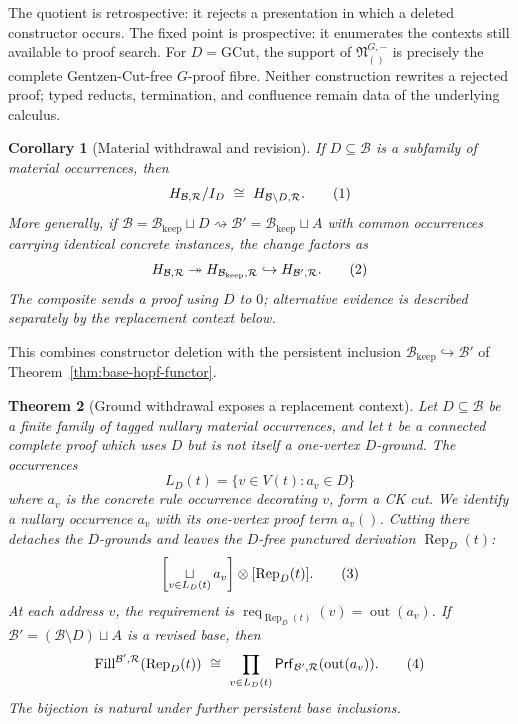\documentclass[10pt,a4paper]{article}
\theoremstyle{plain}
\newtheorem{theorem}{Theorem}[section]
\newtheorem{corollary}[theorem]{Corollary}
\theoremstyle{definition}
\theoremstyle{remark}
\newcommand{\Base}{\mathcal B}
\newcommand{\Rules}{\mathcal R}
\newcommand{\fjoin}{\mathbin{\sqcup}}
\newcommand{\Fill}{\operatorname{Fill}}
\newcommand{\Req}{\operatorname{req}}
\newcommand{\Prf}{\mathsf{Prf}}
\newcommand{\eqtag}{\refstepcounter{equation}\tag{\theequation}}
\begin{document}
The quotient is retrospective: it rejects a presentation in which a
deleted constructor occurs.  The fixed point is prospective: it enumerates
the contexts still available to proof search.  For
\(D=\mathrm{GCut}\), the support of
\(\mathfrak N_{()}^{G,-}\) is precisely the complete
Gentzen-Cut-free \(G\)-proof fibre.  Neither construction rewrites a
rejected proof; typed reducts, termination, and confluence remain data of
the underlying calculus.

\begin{corollary}[Material withdrawal and revision]
\label{thm:material-withdrawal}
If \(D\subseteq\Base\) is a subfamily of material occurrences, then
\[
 H_{\Base,\Rules}/I_D
   \ \cong\
 H_{\Base\setminus D,\Rules}.
\eqtag\label{eq:withdrawal-hopf-quotient}
\]
More generally, if
\(
 \Base=\Base_{\mathrm{keep}}\sqcup D
 \rightsquigarrow
 \Base'=\Base_{\mathrm{keep}}\sqcup A
\)
with common occurrences carrying identical concrete instances, the change factors as
\[
 H_{\Base,\Rules}
   \twoheadrightarrow
 H_{\Base_{\mathrm{keep}},\Rules}
   \hookrightarrow
 H_{\Base',\Rules}.
\eqtag\label{eq:revision-quotient-inclusion}
\]
The composite sends a proof using \(D\) to \(0\); alternative evidence is
described separately by the replacement context below.
\end{corollary}

This combines constructor deletion with the persistent inclusion
\(\Base_{\mathrm{keep}}\hookrightarrow\Base'\) of
Theorem~\ref{thm:base-hopf-functor}.

\begin{theorem}[Ground withdrawal exposes a replacement context]
\label{thm:ground-repair-fibre}
Let \(D\subseteq\Base\) be a finite family of tagged nullary material
occurrences,
and let \(t\) be a connected complete proof which uses \(D\) but is not
itself a one-vertex \(D\)-ground.  The occurrences
\[
 L_D(t)=\{v\in V(t):a_v\in D\}
\]
where \(a_v\) is the concrete rule occurrence decorating \(v\), form a CK
cut.  We identify a nullary occurrence \(a_v\) with its one-vertex
proof term \(a_v()\).
Cutting there detaches the \(D\)-grounds and
leaves the \(D\)-free punctured derivation \(\operatorname{Rep}_D(t)\):
\[
 \left[\mathop{\fjoin}_{v\in L_D(t)}a_v\right]\otimes
       [\operatorname{Rep}_D(t)] .
\eqtag\label{eq:ground-repair-coefficient}
\]
At each address \(v\), the requirement is
\(\Req_{\operatorname{Rep}_D(t)}(v)=\operatorname{out}(a_v)\).  If
\(\Base'=(\Base\setminus D)\sqcup A\) is a revised base, then
\[
 \Fill^{\Base',\Rules}
       (\operatorname{Rep}_D(t))
 \ \cong\
 \prod_{v\in L_D(t)}
       \Prf_{\Base',\Rules}(\operatorname{out}(a_v)).
\eqtag\label{eq:ground-repair-fibre}
\]
The bijection is natural under further persistent base inclusions.
\end{theorem}
\end{document}
